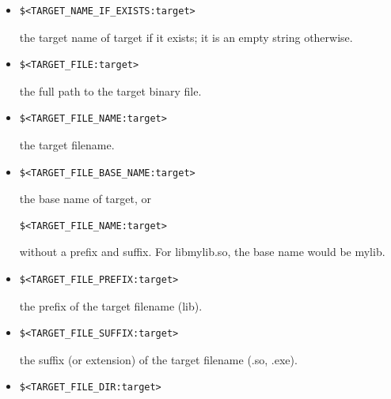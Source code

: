 \begin{itemize}
\item 
\begin{lstlisting}[style=styleCMake]
$<TARGET_NAME_IF_EXISTS:target>
\end{lstlisting}

the target name of target if it exists; it is an empty string otherwise.

\item 
\begin{lstlisting}[style=styleCMake]
$<TARGET_FILE:target>
\end{lstlisting}

the full path to the target binary file.

\item 
\begin{lstlisting}[style=styleCMake]
$<TARGET_FILE_NAME:target>
\end{lstlisting}

the target filename.

\item 
\begin{lstlisting}[style=styleCMake]
$<TARGET_FILE_BASE_NAME:target>
\end{lstlisting}

the base name of target, or

\begin{lstlisting}[style=styleCMake]
$<TARGET_FILE_NAME:target>
\end{lstlisting}

without a prefix and suffix. For libmylib.so, the base name would be mylib.

\item 
\begin{lstlisting}[style=styleCMake]
$<TARGET_FILE_PREFIX:target> 
\end{lstlisting}

the prefix of the target filename (lib).

\item 
\begin{lstlisting}[style=styleCMake]
$<TARGET_FILE_SUFFIX:target>
\end{lstlisting}

the suffix (or extension) of the target filename (.so, .exe).

\item 
\begin{lstlisting}[style=styleCMake]
$<TARGET_FILE_DIR:target>
\end{lstlisting}


\end{itemize}

